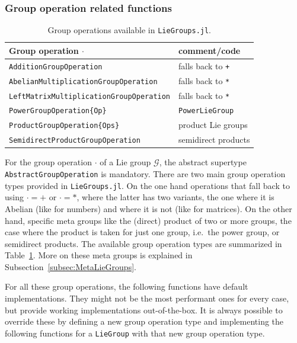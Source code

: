 \documentclass{juliacon}
\begin{document}
\subsubsection*{Group operation related functions}

\begin{table}
    \centering
    \caption{Group operations available in \texttt{LieGroups.jl}.}
    \begin{tabular}{@{}ll@{}}
        \toprule
        \textbf{Group operation} $\cdot$ & comment/code\\
        \midrule
        \verb|AdditionGroupOperation| & falls back to \verb|+|\\
        \verb|AbelianMultiplicationGroupOperation| & falls back to \verb|*|\\
        \verb|LeftMatrixMultiplicationGroupOperation| & falls back to \verb|*|\\
        \verb|PowerGroupOperation{Op}| & \verb|PowerLieGroup|\\
        \verb|ProductGroupOperation{Ops}| & product Lie groups\\
        \verb|SemidirectProductGroupOperation| & semidirect products\\
        \bottomrule
    \end{tabular}
    \label{tab:GroupOperations}
\end{table}

For the group operation \(\cdot\) of a Lie group \(\mathcal{G}\), the abstract supertype \verb|AbstractGroupOperation| is mandatory. There are two main group operation types provided in \verb|LieGroups.jl|. On the one hand operations that fall back to using $\cdot = +$ or $\cdot = *$, where the latter has two variants, the one where it is Abelian (like for numbers) and where it is not (like for matrices).
On the other hand, specific meta groups like the (direct) product of two or more groups, the case where the product is taken for just one group, i.e.\ the power group, or semidirect products. The available group operation types are summarized in Table~\ref{tab:GroupOperations}. More on these meta groups is explained in Subsection~\ref{subsec:MetaLieGroups}.

For all these group operations, the following functions have default implementations. They might not be the most performant ones for every case, but provide working implementations out-of-the-box.
It is always possible to override these by defining a new group operation type and implementing the following functions for a \verb|LieGroup| with that new group operation type.
\end{document}
